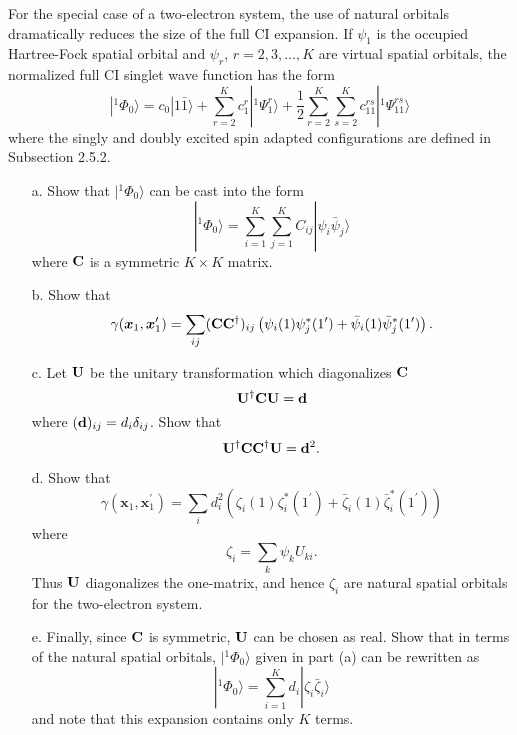 \documentclass[a4paper]{book}
\newcommand{\C}{{\bf C}}
\newcommand{\U}{{\bf U}}
\begin{document}
	\begin{exercise}
	For the special case of a two-electron system, the use of natural orbitals dramatically reduces the size of the full CI expansion. If $\psi_1$ is the occupied Hartree-Fock spatial orbital and $\psi_r$, $r=2,3,...,K$ are virtual spatial orbitals, the normalized full CI singlet wave function has the form
	\[
		|{}^{1}\Phi_0 \rangle = c_0 |1\bar{1}\rangle + \sum_{r=2}^K c^r_1 | {}^{1} \Psi^r_1 \rangle + \frac{1}{2} \sum_{r=2}^K \sum_{s=2}^K c^{rs}_{11} | {}^{1} \Psi^{rs}_{11} \rangle
	\]
	where the singly and doubly excited spin adapted configurations are defined in Subsection 2.5.2.
	
	\begin{enumerate}
	
	\item[a.] Show that $|{}^{1}\Phi_0 \rangle$	can be cast into the form
	\[
		|{}^{1}\Phi_0 \rangle = \sum_{i=1}^K \sum_{j=1}^K C_{ij} | \psi_i \bar{\psi}_j \rangle
	\]
	where $\C$ is a symmetric $K \times K$ matrix.
	
	\item[b.] Show that
	\[
		\gamma( \boldsymbol{x}_1 , \boldsymbol{x}_1^\prime ) = \sum_{ij} (\C \C^\dagger)_{ij} \left( \psi_i(1) \psi^*_j(1^\prime) + \bar{\psi}_i (1) \bar{\psi}_j^* (1^\prime) \right).
	\]
	
	\item[c.] Let $\U$ be the unitary transformation which diagonalizes $\C$
	\[
		\U^\dagger \C \U = {\bf d}
	\]
	where $({\bf d})_{ij} = d_i \delta_{ij}$. Show that
	\[
		\U^\dagger \C \C^\dagger \U = {\bf d}^2.
	\]
	
	\item[d.] Show that
	\[
		\gamma( \boldsymbol{x}_1 , \boldsymbol{x}_1^\prime ) = \sum_i d^2_i \left( \zeta_i(1)\zeta^*_i(1^\prime) + \bar{\zeta}_i(1) \bar{\zeta}^*_i (1^\prime) \right)
	\]
	where
	\[
		\zeta_i = \sum_k \psi_k U_{ki}.
	\]
	Thus $\U$ diagonalizes the one-matrix, and hence $\zeta_i$ are natural spatial orbitals for the two-electron system.
	
	\item[e.] Finally, since $\C$ is symmetric, $\U$ can be chosen as real. Show that in terms of the natural spatial orbitals, $| {}^{1} \Phi_0 \rangle$ given in part (a) can be rewritten as
	\[
		| {}^{1} \Phi_0 \rangle = \sum_{i=1}^K d_i | \zeta_i \bar{\zeta}_i \rangle
	\]
	and note that this expansion contains only $K$ terms.
	\end{enumerate}
	\end{exercise}
	
\end{document}
